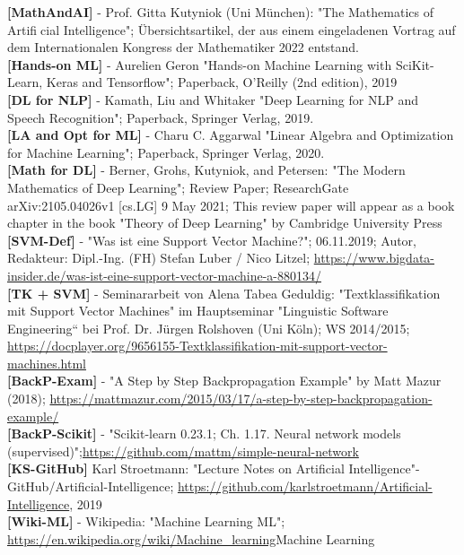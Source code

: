 \documentclass[12pt]{article}
\begin{document}
%
\textbf{[MathAndAI]} - Prof. Gitta Kutyniok (Uni München): "The Mathematics of Artificial Intelligence"; Übersichtsartikel, der aus einem eingeladenen Vortrag auf dem Internationalen Kongress der Mathematiker 2022 entstand.\\[0.2cm]  
%
\textbf{[Hands-on ML]} - Aurelien Geron "Hands-on Machine Learning with SciKit-Learn, Keras and Tensorflow"; Paperback, O'Reilly (2nd edition), 2019\\[0.2cm] 
%
\textbf{[DL for NLP]} - Kamath, Liu and Whitaker "Deep Learning for NLP and Speech Recognition"; Paperback, Springer Verlag, 2019.\\[0.2cm] 
%
\textbf{[LA and Opt for ML]} - Charu C. Aggarwal "Linear Algebra and Optimization for Machine Learning"; Paperback, Springer Verlag, 2020.\\[0.2cm] 
%
\textbf{[Math for DL]} - Berner, Grohs, Kutyniok, and Petersen: "The Modern Mathematics of Deep Learning"; Review Paper; ResearchGate arXiv:2105.04026v1 [cs.LG] 9 May 2021; This review paper will appear as a book chapter in the book "Theory of Deep Learning" by Cambridge University Press\\[0.2cm] 
%
\textbf{[SVM-Def]} - "Was ist eine Support Vector Machine?"; 06.11.2019; Autor, Redakteur: Dipl.-Ing. (FH) Stefan Luber / Nico Litzel; \url{https://www.bigdata-insider.de/was-ist-eine-support-vector-machine-a-880134/}\\[0.2cm] 
%
\textbf{[TK + SVM]} - Seminararbeit von Alena Tabea Geduldig: "Textklassifikation mit Support Vector Machines" im  Hauptseminar "Linguistic Software Engineering“ bei Prof. Dr. Jürgen Rolshoven (Uni Köln); WS 2014/2015; \url{https://docplayer.org/9656155-Textklassifikation-mit-support-vector-machines.html}\\[0.2cm] 
%
\textbf{[BackP-Exam]} - "A Step by Step Backpropagation Example" by Matt Mazur (2018); \url{https://mattmazur.com/2015/03/17/a-step-by-step-backpropagation-example/}\\[0.2cm] 
%
\textbf{[BackP-Scikit]} - "Scikit-learn 0.23.1; Ch. 1.17. Neural network models (supervised)";\url{https://github.com/mattm/simple-neural-network}\\[0.2cm] 
%
\textbf{[KS-GitHub]} Karl Stroetmann: "Lecture Notes on Artificial Intelligence"-  GitHub/Artificial-Intelligence; \url{https://github.com/karlstroetmann/Artificial-Intelligence}, 2019\\[0.2cm]  
%
\textbf{[Wiki-ML]} - Wikipedia: "Machine Learning ML"; \url{https://en.wikipedia.org/wiki/Machine_learning}{Machine Learning}\\[0.2cm] 
\end{document}
